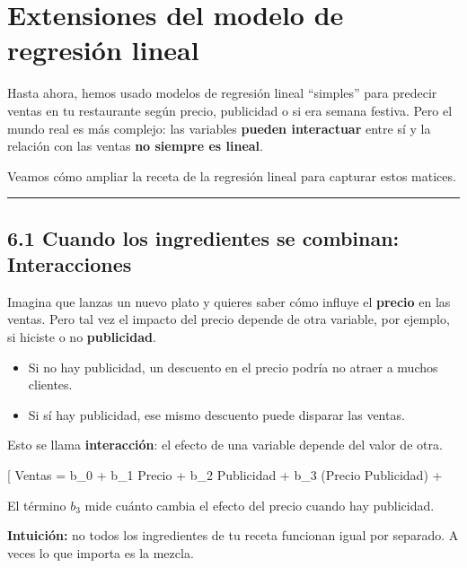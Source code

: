 \documentclass[
  spanish,
  letterpaper,
  DIV=11,
  numbers=noendperiod]{scrreprt}
\providecommand{\tightlist}{%
  \setlength{\itemsep}{0pt}\setlength{\parskip}{0pt}}
\begin{document}

\chapter{Extensiones del modelo de regresión
lineal}\label{extensiones-del-modelo-de-regresiuxf3n-lineal}

Hasta ahora, hemos usado modelos de regresión lineal ``simples'' para
predecir ventas en tu restaurante según precio, publicidad o si era
semana festiva. Pero el mundo real es más complejo: las variables
\textbf{pueden interactuar} entre sí y la relación con las ventas
\textbf{no siempre es lineal}.

Veamos cómo ampliar la receta de la regresión lineal para capturar estos
matices.

\begin{center}\rule{0.5\linewidth}{0.5pt}\end{center}

\section{6.1 Cuando los ingredientes se combinan:
Interacciones}\label{cuando-los-ingredientes-se-combinan-interacciones}

Imagina que lanzas un nuevo plato y quieres saber cómo influye el
\textbf{precio} en las ventas. Pero tal vez el impacto del precio
depende de otra variable, por ejemplo, si hiciste o no
\textbf{publicidad}.

\begin{itemize}
\tightlist
\item
  Si no hay publicidad, un descuento en el precio podría no atraer a
  muchos clientes.\\
\item
  Si sí hay publicidad, ese mismo descuento puede disparar las ventas.
\end{itemize}

Esto se llama \textbf{interacción}: el efecto de una variable depende
del valor de otra.

{[} Ventas = b\_0 + b\_1 \times Precio + b\_2 \times Publicidad + b\_3
\times (Precio \times Publicidad) + \varepsilon {]}

El término \(b_3\) mide cuánto cambia el efecto del precio cuando hay
publicidad.

\begin{tcolorbox}[enhanced jigsaw, toptitle=1mm, opacitybacktitle=0.6, leftrule=.75mm, arc=.35mm, title=\textcolor{quarto-callout-tip-color}{\faLightbulb}\hspace{0.5em}{Tip}, colback=white, bottomrule=.15mm, colbacktitle=quarto-callout-tip-color!10!white, opacityback=0, bottomtitle=1mm, breakable, rightrule=.15mm, coltitle=black, left=2mm, titlerule=0mm, colframe=quarto-callout-tip-color-frame, toprule=.15mm]

\textbf{Intuición:} no todos los ingredientes de tu receta funcionan
igual por separado. A veces lo que importa es la mezcla.

\end{tcolorbox}
\end{document}
